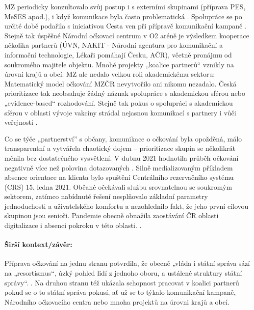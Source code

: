 MZ periodicky konzultovalo svůj postup i s externími skupinami (příprava PES, MeSES apod.), i když komunikace byla často problematická \cite{irozhlas_smejkalovu_2021, jerabkova_smejkal_2021}. Spolupráce se po určité době podařila s iniciativou Cesta ven při přípravě komunikační kampaně \cite{mudrochova_kampan_2020}. Stejně tak úspěšné Národní očkovací centrum v O2 aréně je výsledkem kooperace několika partnerů (ÚVN, NAKIT - Národní agentura pro komunikační a informační technologie, Lékaři pomáhají Česku, AČR), včetně pronájmu od soukromého majitele objektu. Mnohé projekty „koalice partnerů“ vznikly na úrovni krajů a obcí. MZ ale nedalo velkou roli akademickému sektoru: Matematický model očkování MZČR nevytvořilo ani nikomu nezadalo. Česká prioritizace \cite{strategie_ockovani_mzcr_2020} tak neobsahuje žádný náznak spolupráce s akademickou sférou nebo „evidence-based“ rozhodování. Stejně tak pokus o spolupráci s akademickou sférou v oblasti vývoje vakcíny strádal nejasnou komunikací s partnery i vůči veřejnosti \cite{bezdekova_ceska_2021}.

Co se týče „partnerství” s občany, komunikace o očkování byla opožděná, málo transparentní a vytvářela chaotický dojem -- prioritizace skupin se několikrát měnila bez dostatečného vysvětlení. V dubnu 2021 hodnotila průběh očkování negativně více než polovina dotazovaných \cite{cvvm_verejnost_ockovani_2021}. Silně medializovaným příkladem absence orientace na klienta bylo spuštění Centrálního rezervačního systému (CRS) 15. ledna 2021. Občané očekávali službu srovnatelnou se soukromým sektorem, zatímco nabídnuté řešení nesplňovalo základní parametry jednoduchosti a uživatelského komfortu \cite{blaha_registrace_2021} a nezohlednilo fakt, že jeho první cílovou skupinou jsou senioři. Pandemie obecně obnažila zaostávání ČR oblasti digitalizace \cite{usela_pres_2021} i absenci pokroku v této oblasti. \cite{european_comission_desi_2020, hlidac_nedigitalni_2021}.

\paragraph{Širší kontext/závěr:} Příprava očkování na jednu stranu potvrdila, že obecně „vláda i státní správa sází na „resortismus“, úzký pohled lidí z jednoho oboru, a ustálené struktury státní správy“. \cite{hudema_hudema_2021}. Na druhou stranu též ukázala schopnost pracovat v koalici partnerů pokud se o to státní správa pokusí, ať už se to týkalo komunikační kampaně, Národního očkovacího centra nebo mnoha projektů na úrovni krajů a obcí.

